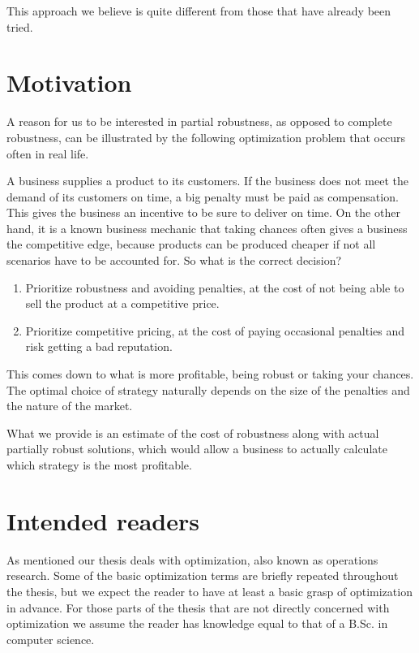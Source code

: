 This approach we believe is quite different from those that have
already been tried.

\section{Motivation}
A reason for us to be interested in partial robustness, as opposed to
 complete robustness, can be illustrated by the following optimization
 problem that occurs often in real life.

\begin{example}
A business supplies a product to its customers. If the business does
 not meet the demand of its customers on time, a big penalty must be
 paid as compensation. This gives the business an incentive to be sure
 to deliver on time. On the other hand, it is a known business
 mechanic that taking chances often gives a business the competitive
 edge, because products can be produced cheaper if not all scenarios
 have to be accounted for. So what is the correct decision?

\begin{enumerate}
\item Prioritize robustness and avoiding penalties, at the cost of not
being able to sell the product at a competitive price.
\item Prioritize competitive pricing, at the cost of paying occasional
penalties and risk getting a bad reputation.
\end{enumerate}
\end{example}

This comes down to what is more profitable, being robust or taking
your chances. The optimal choice of strategy naturally depends on the
size of the penalties and the nature of the market.

What we provide is an estimate of the cost of robustness along with
actual partially robust solutions, which would allow a business to actually
calculate which strategy is the most profitable.

\section{Intended readers}
As mentioned our thesis deals with optimization, also known as
operations research. Some of the basic optimization terms are briefly
repeated throughout the thesis, but we expect the reader to have at
least a basic grasp of optimization in advance. For those parts of the
thesis that are not directly concerned with optimization we assume the
reader has knowledge equal to that of a B.Sc. in computer science.

